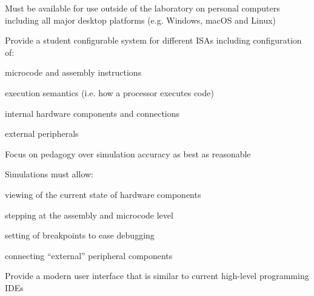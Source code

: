 \begin{requirements}
    \item\label{req:personal} Must be available for use outside of the laboratory on personal computers including all major desktop platforms (e.g. Windows, macOS and Linux)
        
    \item\label{req:configuration} Provide a student configurable system for different ISAs including configuration of:
        \begin{requirements}
            \item microcode and assembly instructions
            \item execution semantics (i.e. how a processor executes code)
            \item internal hardware components and connections
            \item external peripherals
        \end{requirements}
        
    \item\label{req:pedagogical} Focus on pedagogy over simulation accuracy as best as reasonable
       
    \item\label{req:simulations} Simulations must allow: 
        \begin{requirements}
            \item viewing of the current state of hardware components
            \item stepping at the assembly and microcode level
            \item setting of breakpoints to ease debugging
            \item connecting ``external'' peripheral components
        \end{requirements}
    
    \item \label{req:modern} Provide a modern user interface that is similar to current high-level programming IDEs
        
\end{requirements}

